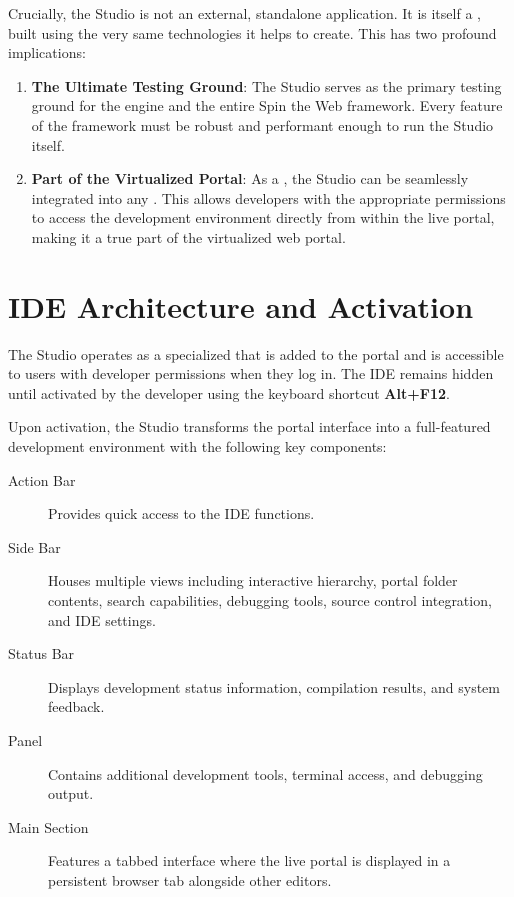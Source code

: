 Crucially, the Studio is not an external, standalone application. It is itself a \textbf{\webbaselet{}}, built using the very same technologies it helps to create. This has two profound implications:

\begin{enumerate}
    \item \textbf{The Ultimate Testing Ground}: The Studio serves as the primary testing ground for the \webspinner{} engine and the entire Spin the Web framework. Every feature of the framework must be robust and performant enough to run the Studio itself.
    \item \textbf{Part of the Virtualized Portal}: As a \webbaselet{}, the Studio can be seamlessly integrated into any \webbase{}. This allows developers with the appropriate permissions to access the development environment directly from within the live portal, making it a true part of the virtualized web portal.
\end{enumerate}

\section{IDE Architecture and Activation}
\label{sec:studio-architecture}

The Studio operates as a specialized \webbaselet{} that is added to the portal \webbase{} and is accessible to users with developer permissions when they log in. The IDE remains hidden until activated by the developer using the keyboard shortcut \textbf{Alt+F12}.

Upon activation, the Studio transforms the portal interface into a full-featured development environment with the following key components:

\begin{description}
    \item[Action Bar] Provides quick access to the IDE functions.
    \item[Side Bar] Houses multiple views including interactive \webbase{} hierarchy, portal folder contents, search capabilities, debugging tools, source control integration, and IDE settings.
    \item[Status Bar] Displays development status information, compilation results, and system feedback.
    \item[Panel] Contains additional development tools, terminal access, and debugging output.
    \item[Main Section] Features a tabbed interface where the live portal is displayed in a persistent browser tab alongside other editors.
\end{description}

